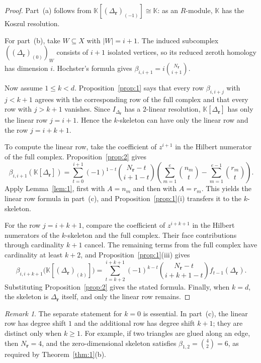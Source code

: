 \documentclass[11pt]{amsart}
\theoremstyle{definition}
\theoremstyle{remark}
\newtheorem{remark}[theorem]{Remark}
\newcommand{\K}{\mathbb K}
\newcommand{\SR}[1]{\K[#1]}
\begin{document}
	\begin{proof}
		Part~(a) follows from $\SR{(\Delta_{\mathbf r})_{(-1)}}\cong\K$: as an $R$-module, $\K$ has the Koszul resolution.
		
		For part~(b), take $W\subseteq X$ with $|W|=i+1$. The induced subcomplex $((\Delta_{\mathbf r})_{(0)})_W$ consists of $i+1$ isolated vertices, so its reduced zeroth homology has dimension $i$. Hochster's formula gives $\beta_{i,i+1}=i\binom{N_{\mathbf r}}{i+1}$.
		
		Now assume $1\le k<d$. Proposition~\ref{prop:1} says that every row $\beta_{i,i+j}$ with $j<k+1$ agrees with the corresponding row of the full complex and that every row with $j>k+1$ vanishes. Since $I_{\Delta_{\mathbf r}}$ has a $2$-linear resolution, $\SR{\Delta_{\mathbf r}}$ has only the linear row $j=i+1$. Hence the $k$-skeleton can have only the linear row and the row $j=i+k+1$.
		
		To compute the linear row, take the coefficient of $z^{i+1}$ in the Hilbert numerator of the full complex. Proposition~\ref{prop:2} gives
		\[
		\beta_{i,i+1}(\SR{\Delta_{\mathbf r}})
		=
		\sum_{t=0}^{i+1}(-1)^{1-t}
		\binom{N_{\mathbf r}-t}{i+1-t}
		\left(
		\sum_{m=1}^e\binom{n_m}{t}
		-
		\sum_{m=1}^{e-1}\binom{r_m}{t}
		\right).
		\]
		Apply Lemma~\ref{lem:1}, first with $A=n_m$ and then with $A=r_m$. This yields the linear row formula in part~(c), and Proposition~\ref{prop:1}(i) transfers it to the $k$-skeleton.
		
		For the row $j=i+k+1$, compare the coefficient of $z^{i+k+1}$ in the Hilbert numerators of the $k$-skeleton and the full complex. Their face contributions through cardinality $k+1$ cancel. The remaining terms from the full complex have cardinality at least $k+2$, and Proposition~\ref{prop:1}(iii) gives
		\[
		\beta_{i,i+k+1}\bigl(\SR{(\Delta_{\mathbf r})_{(k)}}\bigr)
		=
		\sum_{t=k+2}^{i+k+1}(-1)^{k-t}
		\binom{N_{\mathbf r}-t}{i+k+1-t}f_{t-1}(\Delta_{\mathbf r}).
		\]
		Substituting Proposition~\ref{prop:2} gives the stated formula. Finally, when $k=d$, the skeleton is $\Delta_{\mathbf r}$ itself, and only the linear row remains.
	\end{proof}
	
	\begin{remark}\label{rem:3}
		The separate statement for $k=0$ is essential. In part~(c), the linear row has degree shift $1$ and the additional row has degree shift $k+1$; they are distinct only when $k\ge1$. For example, if two triangles are glued along an edge, then $N_{\mathbf r}=4$, and the zero-dimensional skeleton satisfies $\beta_{1,2}=\binom42=6$, as required by Theorem~\ref{thm:1}(b).
	\end{remark}
	
\end{document}
